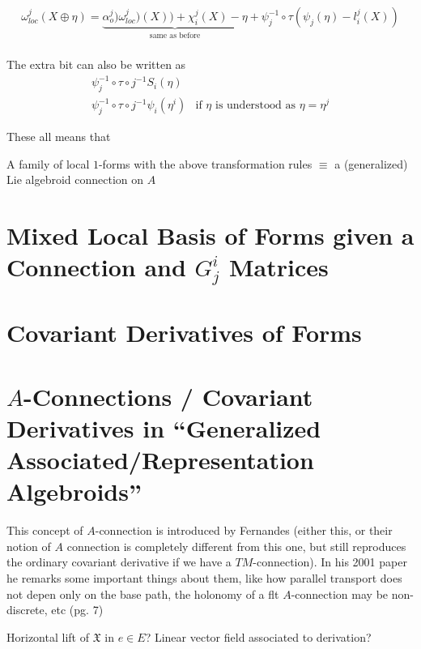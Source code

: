 {\begin{align}
\omega^j_{loc}(X \oplus \eta) 
 = \underbrace{\alpha^j_o)\omega^j_{loc})(X)) + \chi^j_i(X) - \eta}_{\text{same as before}} + \psi_j^{-1}\circ \tau (\psi_j(\eta) - l^j_i(X))\\
\end{align}

The extra bit can also be written as 
\begin{align}
    \psi_j^{-1}\circ \tau \circ j^{-1}S_i(\eta) \\
    \psi_j^{-1}\circ \tau \circ j^{-1}\psi_i(\eta^i) & \text{if $\eta$ is understood as $\eta = \eta^j$}
\end{align}

These all means that
\begin{proposition}
A family of local $1$-forms with the above transformation rules $\equiv$ a (generalized) Lie algebroid connection on $A$
\end{proposition}

\linea

\section{Mixed Local Basis of Forms given a Connection and $G^i_j$ Matrices}

\section{Covariant Derivatives of Forms}

\section{$A$-Connections / Covariant Derivatives in ``Generalized Associated/Representation Algebroids''}

This concept of $A$-connection is introduced by Fernandes (either this, or their notion of $A$ connection is completely different from this one, but still reproduces the ordinary covariant derivative if we have a $TM$-connection). In his 2001 paper he remarks some important things about them, like how parallel transport does not depen only on the base path, the holonomy of a flt $A$-connection may be non-discrete, etc (pg. 7)

Horizontal lift of $\mathfrak{X}$ in $e\in E$? Linear vector field associated to derivation?


}
